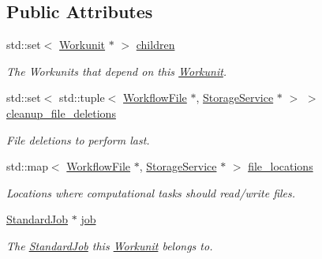 \subsection*{Public Attributes}
\begin{DoxyCompactItemize}
\item 
\mbox{\label{classwrench_1_1_workunit_ad4a4a74cd0e2c687595494fa0e7b0d3e}} 
std\+::set$<$ \hyperlink{classwrench_1_1_workunit}{Workunit} $\ast$ $>$ \hyperlink{classwrench_1_1_workunit_ad4a4a74cd0e2c687595494fa0e7b0d3e}{children}
\begin{DoxyCompactList}\small\item\em The Workunits that depend on this \hyperlink{classwrench_1_1_workunit}{Workunit}. \end{DoxyCompactList}\item 
\mbox{\label{classwrench_1_1_workunit_a65f7cd5374d51a809c89319d8d9895ed}} 
std\+::set$<$ std\+::tuple$<$ \hyperlink{classwrench_1_1_workflow_file}{Workflow\+File} $\ast$, \hyperlink{classwrench_1_1_storage_service}{Storage\+Service} $\ast$ $>$ $>$ \hyperlink{classwrench_1_1_workunit_a65f7cd5374d51a809c89319d8d9895ed}{cleanup\+\_\+file\+\_\+deletions}
\begin{DoxyCompactList}\small\item\em File deletions to perform last. \end{DoxyCompactList}\item 
\mbox{\label{classwrench_1_1_workunit_a612ab0529438becbfe6919458de795ae}} 
std\+::map$<$ \hyperlink{classwrench_1_1_workflow_file}{Workflow\+File} $\ast$, \hyperlink{classwrench_1_1_storage_service}{Storage\+Service} $\ast$ $>$ \hyperlink{classwrench_1_1_workunit_a612ab0529438becbfe6919458de795ae}{file\+\_\+locations}
\begin{DoxyCompactList}\small\item\em Locations where computational tasks should read/write files. \end{DoxyCompactList}\item 
\mbox{\label{classwrench_1_1_workunit_a2264928b16909aad8408251ce44cafb7}} 
\hyperlink{classwrench_1_1_standard_job}{Standard\+Job} $\ast$ \hyperlink{classwrench_1_1_workunit_a2264928b16909aad8408251ce44cafb7}{job}
\begin{DoxyCompactList}\small\item\em The \hyperlink{classwrench_1_1_standard_job}{Standard\+Job} this \hyperlink{classwrench_1_1_workunit}{Workunit} belongs to. \end{DoxyCompactList}\item 

\end{DoxyCompactItemize}
